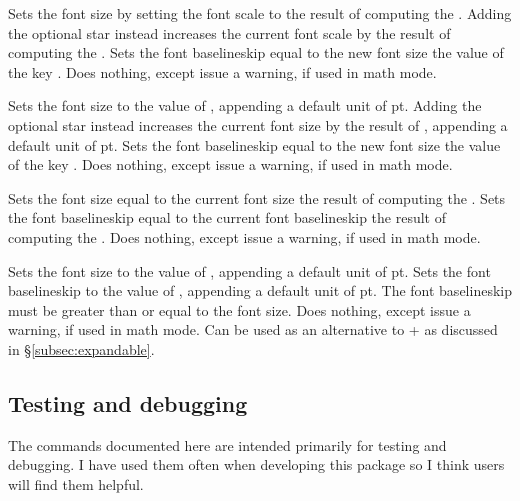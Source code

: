 \documentclass{beery}
\begin{document}
 \sarg{} 
\KeepNextPar*

Sets the font size by setting the font scale to the result of computing the .
Adding the optional star instead increases the current font scale by the result of computing the .
Sets the font baselineskip equal to the new font size \texttimes{} the value of the key .
Does nothing, except issue a warning, if used in math mode.

 \sarg{} 
\KeepNextPar*

Sets the font size to the value of , appending a default unit of \unit{pt}.
Adding the optional star instead increases the current font size by the result of , appending a default unit of \unit{pt}.
Sets the font baselineskip equal to the new font size \texttimes{} the value of the key .
Does nothing, except issue a warning, if used in math mode.

 
\KeepNextPar*

Sets the font size equal to the current font size \texttimes{} the result of computing the .
Sets the font baselineskip equal to the current font baselineskip \texttimes{} the result of computing the .
Does nothing, except issue a warning, if used in math mode.

  
\KeepNextPar*

Sets the font size to the value of , appending a default unit of \unit{pt}.
Sets the font baselineskip to the value of , appending a default unit of \unit{pt}.
The font baselineskip must be greater than or equal to the font size.
Does nothing, except issue a warning, if used in math mode.
Can be used as an alternative to  +  as discussed in \S\ref{subsec:expandable}.

\subsection{Testing and debugging}
\label{subsec:debug}

The commands documented here are intended primarily for testing and debugging.
I have used them often when developing this package so I think users will find them helpful.
\end{document}
